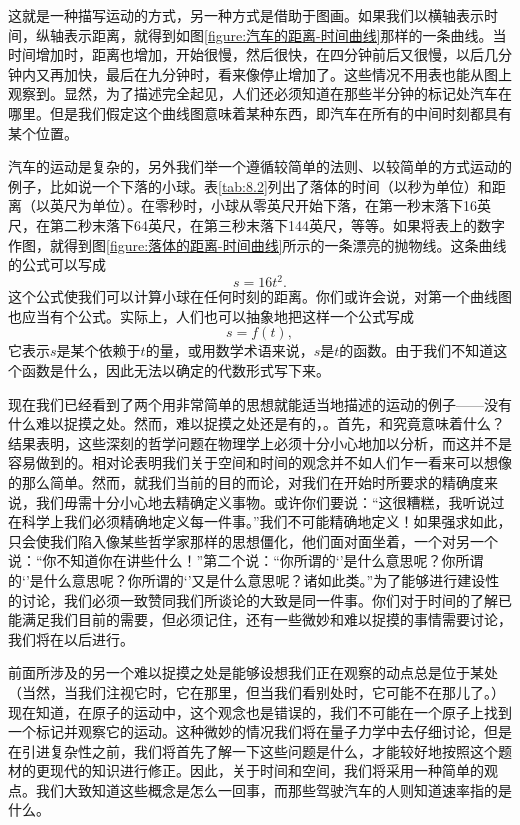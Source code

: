 这就是一种描写运动的方式，另一种方式是借助于图画。如果我们以横轴表示时间，纵轴表示距离，就得到如图\ref{figure:汽车的距离-时间曲线}那样的一条曲线。当时间增加时，距离也增加，开始很慢，然后很快，在四分钟前后又很慢，以后几分钟内又再加快，最后在九分钟时，看来像停止增加了。这些情况不用表也能从图上观察到。显然，为了描述完全起见，人们还必须知道在那些半分钟的标记处汽车在哪里。但是我们假定这个曲线图意味着某种东西，即汽车在所有的中间时刻都具有某个位置。

汽车的运动是复杂的，另外我们举一个遵循较简单的法则、以较简单的方式运动的例子，比如说一个下落的小球。表\ref{tab:8.2}列出了落体的时间（以秒为单位）和距离（以英尺为单位）。在零秒时，小球从零英尺开始下落，在第一秒末落下16英尺，在第二秒末落下64英尺，在第三秒末落下144英尺，等等。如果将表上的数字作图，就得到图\ref{figure:落体的距离-时间曲线}所示的一条漂亮的抛物线。这条曲线的公式可以写成
\begin{equation}
\label{Eq:I:8:1}
s=16t^2.
\end{equation}
这个公式使我们可以计算小球在任何时刻的距离。你们或许会说，对第一个曲线图也应当有个公式。实际上，人们也可以抽象地把这样一个公式写成
\begin{equation}
\label{Eq:I:8:2}
s=f(t),
\end{equation}
它表示$s$是某个依赖于$t$的量，或用数学术语来说，$s$是$t$的函数。由于我们不知道这个函数是什么，因此无法以确定的代数形式写下来。

现在我们已经看到了两个用非常简单的思想就能适当地描述的运动的例子——没有什么难以捉摸之处。然而，难以捉摸之处还是有的，。首先，和究竟意味着什么？结果表明，这些深刻的哲学问题在物理学上必须十分小心地加以分析，而这并不是容易做到的。相对论表明我们关于空间和时间的观念并不如人们乍一看来可以想像的那么简单。然而，就我们当前的目的而论，对我们在开始时所要求的精确度来说，我们毋需十分小心地去精确定义事物。或许你们要说：“这很糟糕，我听说过在科学上我们必须精确地定义每一件事。”我们不可能精确地定义！如果强求如此，只会使我们陷入像某些哲学家那样的思想僵化，他们面对面坐着，一个对另一个说：“你不知道你在讲些什么！”第二个说：“你所谓的‘’是什么意思呢？你所谓的‘’是什么意思呢？你所谓的‘’又是什么意思呢？诸如此类。”为了能够进行建设性的讨论，我们必须一致赞同我们所谈论的大致是同一件事。你们对于时间的了解已能满足我们目前的需要，但必须记住，还有一些微妙和难以捉摸的事情需要讨论，我们将在以后进行。

前面所涉及的另一个难以捉摸之处是能够设想我们正在观察的动点总是位于某处（当然，当我们注视它时，它在那里，但当我们看别处时，它可能不在那儿了。）现在知道，在原子的运动中，这个观念也是错误的，我们不可能在一个原子上找到一个标记并观察它的运动。这种微妙的情况我们将在量子力学中去仔细讨论，但是在引进复杂性之前，我们将首先了解一下这些问题是什么，才能较好地按照这个题材的更现代的知识进行修正。因此，关于时间和空间，我们将采用一种简单的观点。我们大致知道这些概念是怎么一回事，而那些驾驶汽车的人则知道速率指的是什么。

